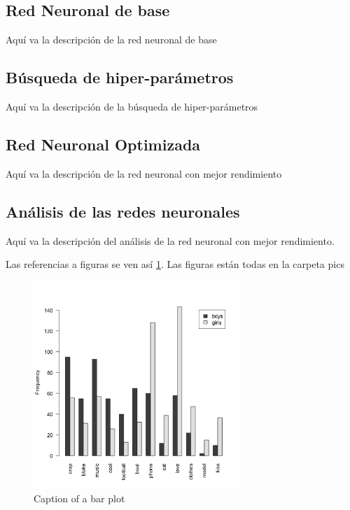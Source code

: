 \documentclass[a4paper,12pt]{article}
\begin{document}
\subsection{Red Neuronal de base}
\label{sec:clasRedBase}
Aquí va la descripción de la red neuronal de base

\subsection{Búsqueda de hiper-parámetros}
\label{sec:clasHiper}
Aquí va la descripción de la búsqueda de hiper-parámetros

\subsection{Red Neuronal Optimizada}
\label{sec:clasRedOpt}
Aquí va la descripción de la red neuronal con mejor rendimiento

\subsection{Análisis de las redes neuronales}
\label{sec:clasAn}
Aquí va la descripción del análisis de la red neuronal con mejor rendimiento.

Las referencias a figuras se ven así \ref{fig:bp}. Las figuras están todas en la carpeta pics

\begin{figure}[htbp] \begin{center}
\includegraphics[width=0.7\textwidth]{pics/boysgirls.png}
\caption{Caption of a bar plot} \label{fig:bp}
\end{center} \end{figure}
\end{document}
